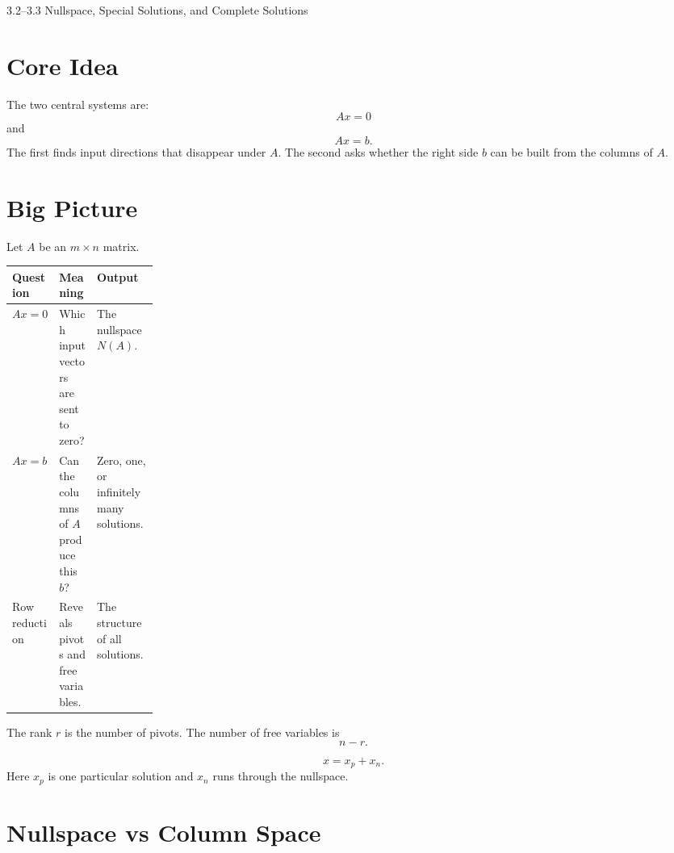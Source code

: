 \documentclass[10pt]{article}
\begin{document}
\begin{center}
{\LARGE 3.2--3.3 Nullspace, Special Solutions, and Complete Solutions\par}
\end{center}

\section{Core Idea}


The two central systems are:
\[
Ax=0
\]
and
\[
Ax=b.
\]
The first finds input directions that disappear under \(A\). The second asks whether the right side \(b\) can be built from the columns of \(A\).

\section{Big Picture}

Let \(A\) be an \(m\times n\) matrix.

\begin{center}
\small
\begin{tabularx}{\linewidth}{@{}L{0.21\linewidth}Y Y@{}}
\toprule
Question & Meaning & Output \\
\midrule
\(Ax=0\) & Which input vectors are sent to zero? & The nullspace \(N(A)\). \\
\(Ax=b\) & Can the columns of \(A\) produce this \(b\)? & Zero, one, or infinitely many solutions. \\
Row reduction & Reveals pivots and free variables. & The structure of all solutions. \\
\bottomrule
\end{tabularx}
\end{center}

The rank \(r\) is the number of pivots. The number of free variables is
\[
n-r.
\]

\[
x=x_p+x_n.
\]
Here \(x_p\) is one particular solution and \(x_n\) runs through the nullspace.

\section{Nullspace vs Column Space}
\end{document}
